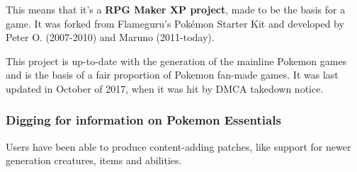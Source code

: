 \documentclass[11pt]{article}
\begin{document}
This means that it's a \textbf{RPG Maker XP project}, made to be the basis for a game. It was forked from Flameguru's Pokémon Starter Kit and developed by Peter O. (2007-2010) and Maruno (2011-today).

This project is up-to-date with the  generation of the mainline Pokemon games and is the basis of a fair proportion of Pokemon fan-made games. It was last updated in October of 2017, when it was hit by DMCA takedown notice.

\newpage
\subsubsection{Digging for information on Pokemon Essentials}

Users have been able to produce content-adding patches, like support for newer generation creatures, items and abilities.
\end{document}
